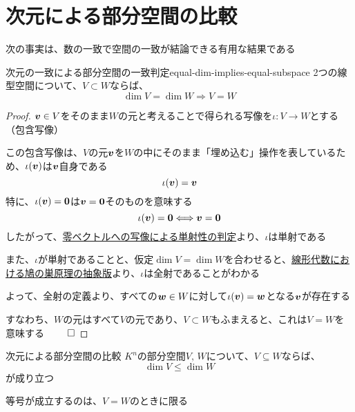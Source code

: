 \documentclass[../../../topic_linear-algebra]{subfiles}
\begin{document}
\sectionline
\section{次元による部分空間の比較}

次の事実は、数の一致で空間の一致が結論できる有用な結果である

\begin{theorem}{次元の一致による部分空間の一致判定}{equal-dim-implies-equal-subspace}
  2つの線型空間について、$V \subset W$ならば、
  \begin{equation*}
    \dim V = \dim W \Longrightarrow V = W
  \end{equation*}
\end{theorem}

\begin{proof}
  $\vb*{v} \in V$をそのまま$W$の元と考えることで得られる写像を$\iota \colon V \to W$とする（包含写像）

  \br

  この包含写像は、$V$の元$\vb*{v}$を$W$の中にそのまま「埋め込む」操作を表しているため、$\iota(\vb*{v})$は$\vb*{v}$自身である
  \begin{equation*}
    \iota(\vb*{v}) = \vb*{v}
  \end{equation*}
  特に、$\iota(\vb*{v}) = \vb*{0}$は$\vb*{v} = \vb*{0}$そのものを意味する
  \begin{equation*}
    \iota(\vb*{v}) = \vb*{0} \Longleftrightarrow \vb*{v} = \vb*{0}
  \end{equation*}
  したがって、\hyperref[thm:injective-zero-test]{零ベクトルへの写像による単射性の判定}より、$\iota$は単射である

  \br

  また、$\iota$が単射であることと、仮定$\dim V = \dim W$を合わせると、\hyperref[thm:abstract-linear-pigeonhole]{線形代数における鳩の巣原理の抽象版}より、$\iota$は全射であることがわかる

  \br

  よって、全射の定義より、すべての$\vb*{w} \in W$に対して$\iota(\vb*{v}) = \vb*{w}$となる$\vb*{v}$が存在する

  すなわち、$W$の元はすべて$V$の元であり、$V \subset W$もふまえると、これは$V=W$を意味する $\qed$
\end{proof}

\sectionline

\begin{theorem*}{次元による部分空間の比較}
  $K^n$の部分空間$V,\,W$について、$V \subseteq W$ならば、
  \begin{equation*}
    \dim V \leq \dim W
  \end{equation*}
  が成り立つ

  等号が成立するのは、$V = W$のときに限る
\end{theorem*}
\end{document}
